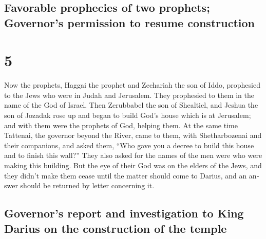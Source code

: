\begin{paracol}{2}
\begin{otherlanguage}{english}
{\subsection{Favorable prophecies of two prophets; Governor's permission
to resume
construction}\label{favorable-prophecies-of-two-prophets-governors-permission-to-resume-construction}}

\hypertarget{section-9}{%
\section{5}\label{section-9}}

 Now the prophets, Haggai the prophet and Zechariah the
son of Iddo, prophesied to the Jews who were in Judah and Jerusalem.
They prophesied to them in the name of the God of Israel. 
Then Zerubbabel the son of Shealtiel, and Jeshua the son of Jozadak rose
up and began to build God's house which is at Jerusalem; and with them
were the prophets of God, helping them.  At the same time
Tattenai, the governor beyond the River, came to them, with
Shetharbozenai and their companions, and asked them, ``Who gave you a
decree to build this house and to finish this wall?'' 
They also asked for the names of the men were who were making this
building.  But the eye of their God was on the elders of
the Jews, and they didn't make them cease until the matter should come
to Darius, and an answer should be returned by letter concerning it.

\hypertarget{governors-report-and-investigation-to-king-darius-on-the-construction-of-the-temple}{%
\subsection{Governor's report and investigation to King Darius on the
construction of the
temple}\label{governors-report-and-investigation-to-king-darius-on-the-construction-of-the-temple}}


\end{otherlanguage}
\end{paracol}
